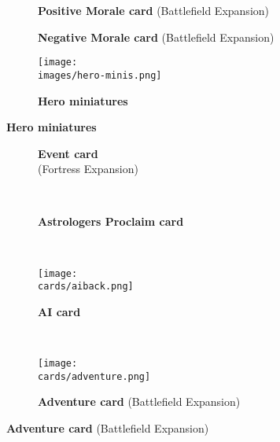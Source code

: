 \begin{figure}[H]
  \centering
  \begin{subfigure}[b]{0.25\linewidth}
    \caption{\textbf{Positive Morale card} (Battlefield Expansion)}
  \end{subfigure}
  \begin{subfigure}[b]{0.25\linewidth}
    \caption{\textbf{Negative Morale card} (Battlefield Expansion)}
  \end{subfigure}
  \begin{subfigure}[b]{0.4\linewidth}
    \centering
    \texttt{[image: \\images/hero-minis.png]}
    \caption{\textbf{Hero miniatures}}
  \end{subfigure}
\end{figure}
\vspace*{-2em}
\clearpage
\vspace*{-4em}
\begin{figure}[H]
  \centering
  \begin{subfigure}[t]{0.23\linewidth}
    \centering
    \caption{\textbf{Event card}\\(Fortress Expansion)}
  \end{subfigure}
  ~
  \begin{subfigure}[t]{0.23\linewidth}
    \centering
    \caption{\textbf{Astrologers Proclaim card}}
  \end{subfigure}
  ~
  \begin{subfigure}[t]{0.23\linewidth}
    \centering
    \texttt{[image: \\cards/aiback.png]}
    \caption{\textbf{AI card}}
  \end{subfigure}
  ~
  \begin{subfigure}[t]{0.23\linewidth}
    \centering
    \texttt{[image: \\cards/adventure.png]}
    \caption{\textbf{Adventure card} (Battlefield Expansion)}
  \end{subfigure}
\end{figure}
